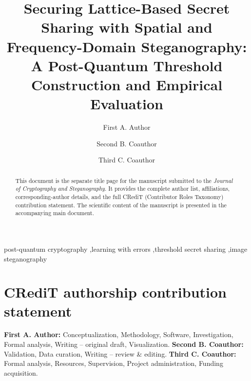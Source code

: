\documentclass[preprint,12pt]{elsarticle}
\begin{document}
\begin{frontmatter}

\title{Securing Lattice-Based Secret Sharing with Spatial and
Frequency-Domain Steganography: A Post-Quantum Threshold Construction
and Empirical Evaluation}

\author[inst1]{First A. Author}
\author[inst1]{Second B. Coauthor}
\author[inst2]{Third C. Coauthor}



\begin{abstract}
This document is the separate title page for the manuscript submitted to the
\emph{Journal of Cryptography and Steganography}. It provides the complete
author list, affiliations, corresponding-author details, and the full CRediT
(Contributor Roles Taxonomy) contribution statement. The scientific content of
the manuscript is presented in the accompanying main document.
\end{abstract}

\begin{keyword}
post-quantum cryptography \sep learning with errors \sep threshold secret
sharing \sep image steganography
\end{keyword}

\end{frontmatter}

\section*{CRediT authorship contribution statement}

\textbf{First A. Author:} Conceptualization, Methodology, Software,
Investigation, Formal analysis, Writing -- original draft, Visualization.
\textbf{Second B. Coauthor:} Validation, Data curation, Writing -- review \&
editing. \textbf{Third C. Coauthor:} Formal analysis, Resources, Supervision,
Project administration, Funding acquisition.
\end{document}
